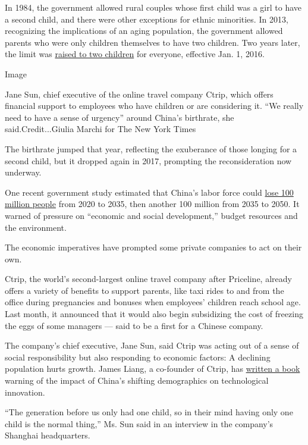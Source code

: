 In 1984, the government allowed rural couples whose first child was a
girl to have a second child, and there were other exceptions for ethnic
minorities. In 2013, recognizing the implications of an aging
population, the government allowed parents who were only children
themselves to have two children. Two years later, the limit was
\href{https://www.nytimes3xbfgragh.onion/2015/10/30/world/asia/china-end-one-child-policy.html}{raised
to two children} for everyone, effective Jan. 1, 2016.

Image

Jane Sun, chief executive of the online travel company Ctrip, which
offers financial support to employees who have children or are
considering it. ``We really need to have a sense of urgency'' around
China's birthrate, she said.Credit...Giulia Marchi for The New York
Times

The birthrate jumped that year, reflecting the exuberance of those
longing for a second child, but it dropped again in 2017, prompting the
reconsideration now underway.

One recent government study estimated that China's labor force could
\href{http://www.cppcc.gov.cn/zxww/2018/07/13/ARTI1531443023003519.shtml}{lose
100 million people} from 2020 to 2035, then another 100 million from
2035 to 2050. It warned of pressure on ``economic and social
development,'' budget resources and the environment.

The economic imperatives have prompted some private companies to act on
their own.

Ctrip, the world's second-largest online travel company after Priceline,
already offers a variety of benefits to support parents, like taxi rides
to and from the office during pregnancies and bonuses when employees'
children reach school age. Last month, it announced that it would also
begin subsidizing the cost of freezing the eggs of some managers ---
said to be a first for a Chinese company.

The company's chief executive, Jane Sun, said Ctrip was acting out of a
sense of social responsibility but also responding to economic factors:
A declining population hurts growth. James Liang, a co-founder of Ctrip,
has
\href{https://www.wiley.com/en-us/The+Demographics+of+Innovation\%3A+Why+Demographics+is+a+Key+to+the+Innovation+Race-p-9781119408925}{written
a book} warning of the impact of China's shifting demographics on
technological innovation.

``The generation before us only had one child, so in their mind having
only one child is the normal thing,'' Ms. Sun said in an interview in
the company's Shanghai headquarters.

